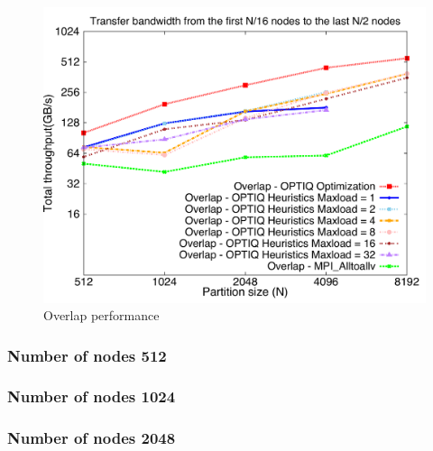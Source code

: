 \documentclass[letter]{article}
\begin{document}
\begin{figure}[h]
\vspace{-0.1in}
\centering
\includegraphics[scale=0.50]{report_figures/constantr_27.pdf}
\vspace{-0.1in}
\caption{Overlap performance}
\vspace{-0.1in}
\label{fig:patterns}
\end{figure}

\newpage

\subsubsection{Number of nodes 512}





\newpage

\subsubsection{Number of nodes 1024}





\newpage

\subsubsection{Number of nodes 2048}


\end{document}
